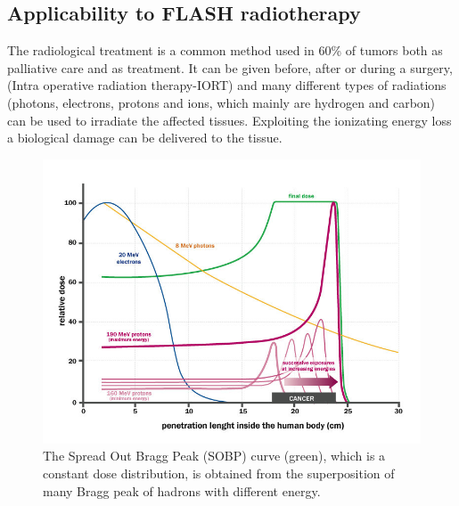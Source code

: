    \subsection{Applicability to FLASH radiotherapy}
        The radiological treatment is a common method used in 60\% of tumors both as palliative care and as treatment. It can be given before, after or during a surgery, (Intra operative radiation therapy-IORT) and many different types of radiations (photons, electrons, protons and ions, which mainly are hydrogen and carbon) can be used to irradiate the affected tissues.
        Exploiting the ionizating energy loss a biological damage can be delivered to the tissue. 

        \begin{figure}
            \centering
            \includegraphics[width=.7\linewidth]{figures/pixel_detectors_usage/Bragg-Peak.png}
            \caption{The Spread Out Bragg Peak (SOBP) curve (green), which is a constant dose distribution, is obtained from the superposition of many Bragg peak of hadrons with different energy.}
            \label{fig:Bragg-peak}
         \end{figure}

